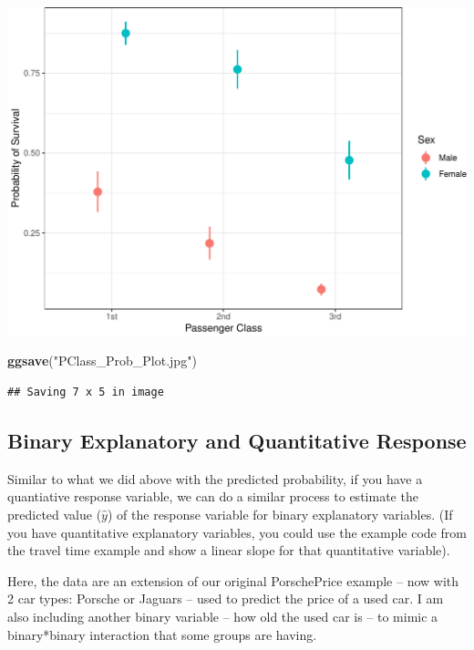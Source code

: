 \documentclass[]{article}
\newenvironment{Shaded}{\begin{snugshade}}{\end{snugshade}}
\newcommand{\KeywordTok}[1]{\textcolor[rgb]{0.13,0.29,0.53}{\textbf{#1}}}
\newcommand{\NormalTok}[1]{#1}
\newcommand{\StringTok}[1]{\textcolor[rgb]{0.31,0.60,0.02}{#1}}
\begin{document}
\includegraphics{Visualization_Examples_2020_v01_files/figure-latex/unnamed-chunk-12-1.pdf}

\begin{Shaded}
\begin{Highlighting}[]
\KeywordTok{ggsave}\NormalTok{(}\StringTok{"PClass_Prob_Plot.jpg"}\NormalTok{)}
\end{Highlighting}
\end{Shaded}

\begin{verbatim}
## Saving 7 x 5 in image
\end{verbatim}

\hypertarget{binary-explanatory-and-quantitative-response}{%
\subsection{Binary Explanatory and Quantitative
Response}\label{binary-explanatory-and-quantitative-response}}

Similar to what we did above with the predicted probability, if you have
a quantiative response variable, we can do a similar process to estimate
the predicted value (\(\hat{y}\)) of the response variable for binary
explanatory variables. (If you have quantitative explanatory variables,
you could use the example code from the travel time example and show a
linear slope for that quantitative variable).

Here, the data are an extension of our original PorschePrice example --
now with 2 car types: Porsche or Jaguars -- used to predict the price of
a used car. I am also including another binary variable -- how old the
used car is -- to mimic a binary*binary interaction that some groups are
having.
\end{document}
